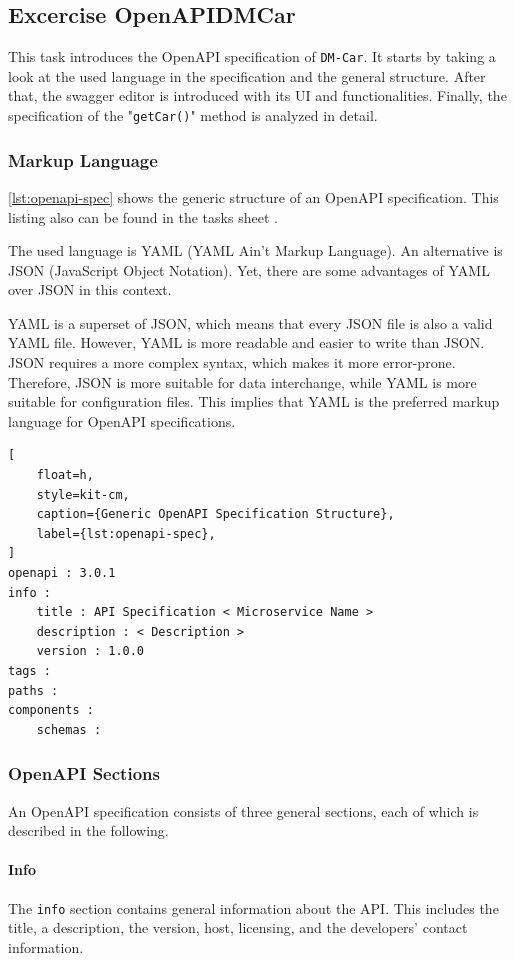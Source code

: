 \subsection{Excercise OpenAPIDMCar}
This task introduces the OpenAPI specification of \texttt{DM-Car}.
It starts by taking a look at the used language in the specification and the general structure.
After that, the swagger editor \cite{SWA-EDI} is introduced with its UI and functionalities.
Finally, the specification of the "\texttt{getCar()}" method is analyzed in detail.

\subsubsection*{Markup Language}
\autoref*{lst:openapi-spec} shows the generic structure of an OpenAPI specification.
This listing also can be found in the tasks sheet \cite{CM-T-DMC}.

The used language is YAML (YAML Ain't Markup Language).
An alternative is JSON (JavaScript Object Notation).
Yet, there are some advantages of YAML over JSON in this context.

YAML is a superset of JSON, which means that every JSON file is also a valid YAML file.
However, YAML is more readable and easier to write than JSON.
JSON requires a more complex syntax, which makes it more error-prone.
Therefore, JSON is more suitable for data interchange, while YAML is more suitable for configuration files.
This implies that YAML is the preferred markup language for OpenAPI specifications.

\begin{lstlisting}[
    float=h,
    style=kit-cm,
    caption={Generic OpenAPI Specification Structure},
    label={lst:openapi-spec},
]
openapi : 3.0.1
info :
    title : API Specification < Microservice Name >
    description : < Description >
    version : 1.0.0
tags :
paths :
components :
    schemas :
\end{lstlisting}

\subsubsection*{OpenAPI Sections}
An OpenAPI specification consists of three general sections, each of which is described in the following.
\paragraph*{Info}
The \texttt{info} section contains general information about the API.
This includes the title, a description, the version, host, licensing, and the developers' contact information.

